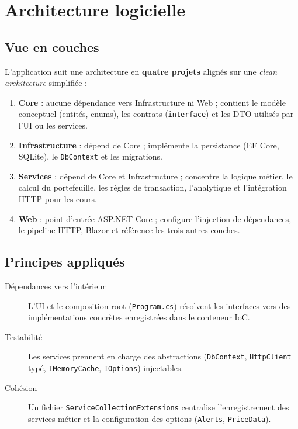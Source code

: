 \chapter{Architecture logicielle}
\label{ch:arch}

\section{Vue en couches}

L'application suit une architecture en \textbf{quatre projets} alignés sur une \emph{clean architecture} simplifiée :

\begin{enumerate}[leftmargin=*]
  \item \textbf{Core} : aucune dépendance vers Infrastructure ni Web ; contient le modèle conceptuel (entités, enums), les contrats (\texttt{interface}) et les DTO utilisés par l'UI ou les services.
  \item \textbf{Infrastructure} : dépend de Core ; implémente la persistance (EF Core, SQLite), le \texttt{DbContext} et les migrations.
  \item \textbf{Services} : dépend de Core et Infrastructure ; concentre la logique métier, le calcul du portefeuille, les règles de transaction, l'analytique et l'intégration HTTP pour les cours.
  \item \textbf{Web} : point d'entrée ASP.NET Core ; configure l'injection de dépendances, le pipeline HTTP, Blazor et référence les trois autres couches.
\end{enumerate}

\section{Principes appliqués}

\begin{description}
  \item[Dépendances vers l'intérieur] L'UI et le composition root (\texttt{Program.cs}) résolvent les interfaces vers des implémentations concrètes enregistrées dans le conteneur IoC.
  \item[Testabilité] Les services prennent en charge des abstractions (\texttt{DbContext}, \texttt{HttpClient} typé, \texttt{IMemoryCache}, \texttt{IOptions}) injectables.
  \item[Cohésion] Un fichier \texttt{ServiceCollectionExtensions} centralise l'enregistrement des services métier et la configuration des options (\texttt{Alerts}, \texttt{PriceData}).
\end{description}

